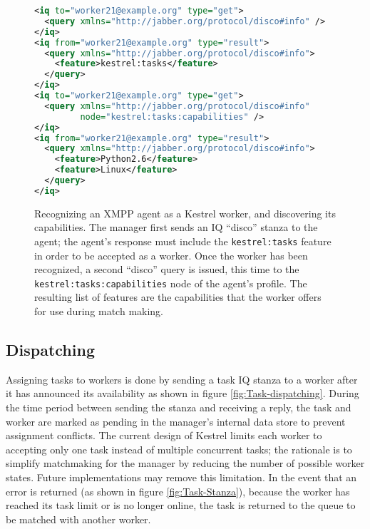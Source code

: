 %
\begin{figure}
\begin{lstlisting}[language=XML,tabsize=4]
<iq to="worker21@example.org" type="get">
  <query xmlns="http://jabber.org/protocol/disco#info" />
</iq>
<iq from="worker21@example.org" type="result">
  <query xmlns="http://jabber.org/protocol/disco#info"> 
    <feature>kestrel:tasks</feature> 
  </query> 
</iq>
<iq to="worker21@example.org" type="get"> 
  <query xmlns="http://jabber.org/protocol/disco#info" 
         node="kestrel:tasks:capabilities" /> 
</iq>
<iq from="worker21@example.org" type="result">
  <query xmlns="http://jabber.org/protocol/disco#info">
    <feature>Python2.6</feature>
    <feature>Linux</feature>
  </query>
</iq>
\end{lstlisting}
\caption{\label{fig:Discover-Worker} Recognizing an XMPP agent as a Kestrel
worker, and discovering its capabilities. The manager first sends
an IQ {}``disco'' stanza to the agent; the agent's response must
include the \texttt{kestrel:tasks} feature in order to be accepted
as a worker. Once the worker has been recognized, a second {}``disco''
query is issued, this time to the \texttt{kestrel:tasks:capabilities}
node of the agent's profile. The resulting list of features are the
capabilities that the worker offers for use during match making.}

\end{figure}



\subsection{Dispatching}

\label{sec:Kestrel:Dispatching} Assigning tasks to workers is done
by sending a task IQ stanza to a worker after it has announced its
availability as shown in figure \ref{fig:Task-dispatching}. During
the time period between sending the stanza and receiving a reply,
the task and worker are marked as pending in the manager's internal
data store to prevent assignment conflicts. The current design of
Kestrel limits each worker to accepting only one task instead of multiple
concurrent tasks; the rationale is to simplify matchmaking for the
manager by reducing the number of possible worker states. Future implementations
may remove this limitation. In the event that an error is returned
(as shown in figure \ref{fig:Task-Stanza}), because the worker has
reached its task limit or is no longer online, the task is returned
to the queue to be matched with another worker.

